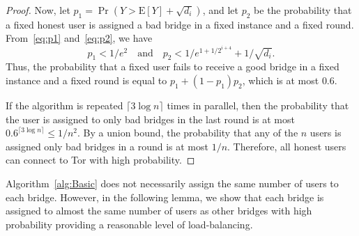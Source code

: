 \documentclass[letterpaper,twocolumn,10pt]{article}
\newcommand{\E}{\mathbf{\mathrm{E}}}
\begin{document}
\begin{proof}
	Now, let ${p_1 = \Pr(Y > \E[Y] + \sqrt{d_i})}$, and let $p_2$ be the probability that a fixed honest user is assigned a bad bridge in a fixed instance and a fixed round. From~\eqref{eq:p1} and~\eqref{eq:p2}, we have
	\[p_1 < 1/e^2 \quad \text{and} \quad p_2 < 1/e^{1+1/2^{i+4}} + 1/\sqrt{d_i}.\]
	Thus, the probability that a fixed user fails to receive a good bridge in a fixed instance and a fixed round is equal to ${p_1 + (1-p_1)p_2}$, which is at most $0.6$.
	
	If the algorithm is repeated ${\lceil 3\log{n} \rceil}$ times in parallel, then the probability that the user is assigned to only bad bridges in the last round is at most ${0.6^{\lceil 3\log{n} \rceil} \leq 1/n^2}$.
	By a union bound, the probability that any of the $n$ users is assigned only bad bridges in a round is at most $1/n$. 
	Therefore, all honest users can connect to Tor with high probability.
\end{proof}


Algorithm~\ref{alg:Basic} does not necessarily assign the same number of users to each bridge. However, in the following lemma, we show that each bridge is assigned to almost the same number of users as other bridges with high probability providing a reasonable level of load-balancing.
\end{document}
